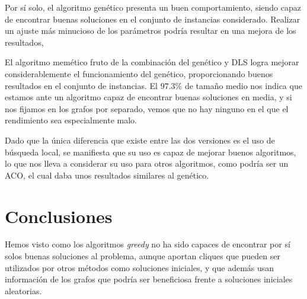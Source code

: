 Por sí solo, el algoritmo genético presenta un buen comportamiento, siendo capaz de
encontrar buenas soluciones en el conjunto de instancias considerado. Realizar un
ajuste más minucioso de los parámetros podría resultar en una mejora de los resultados,

El algoritmo memético fruto de la combinación del genético y DLS logra mejorar
considerablemente el funcionamiento del genético, proporcionando buenos resultados
en el conjunto de instancias. El $97.3\%$ de tamaño medio nos indica que estamos
ante un algoritmo capaz de encontrar buenas soluciones en media, y si nos fijamos
en los grafos por separado, vemos que no hay ninguno en el que el rendimiento sea
especialmente malo.

Dado que la única diferencia que existe entre las dos versiones es el uso de búsqueda
local, se manifiesta que su uso es capaz de mejorar buenos algoritmos, lo que nos
lleva a considerar su uso para otros algoritmos, como podría ser un ACO, el cual
daba unos resultados similares al genético.

\section{Conclusiones}

Hemos visto como los algoritmos \textit{greedy} no ha sido capaces de encontrar por
sí solos buenas soluciones al problema, aunque aportan cliques que pueden ser utilizados
por otros métodos como soluciones iniciales, y que además usan información de los
grafos que podría ser beneficiosa frente a soluciones iniciales aleatorias.




\iffalse

